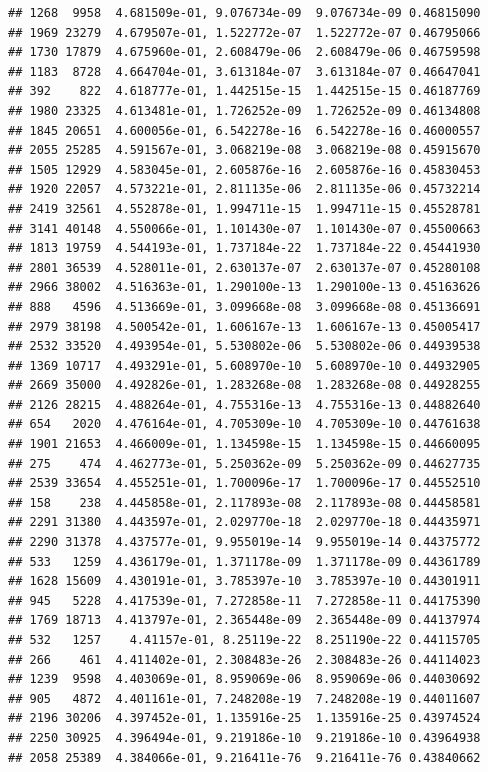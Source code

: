 \documentclass[
]{article}
\begin{document}
\begin{verbatim}
## 1268  9958  4.681509e-01, 9.076734e-09  9.076734e-09 0.46815090
## 1969 23279  4.679507e-01, 1.522772e-07  1.522772e-07 0.46795066
## 1730 17879  4.675960e-01, 2.608479e-06  2.608479e-06 0.46759598
## 1183  8728  4.664704e-01, 3.613184e-07  3.613184e-07 0.46647041
## 392    822  4.618777e-01, 1.442515e-15  1.442515e-15 0.46187769
## 1980 23325  4.613481e-01, 1.726252e-09  1.726252e-09 0.46134808
## 1845 20651  4.600056e-01, 6.542278e-16  6.542278e-16 0.46000557
## 2055 25285  4.591567e-01, 3.068219e-08  3.068219e-08 0.45915670
## 1505 12929  4.583045e-01, 2.605876e-16  2.605876e-16 0.45830453
## 1920 22057  4.573221e-01, 2.811135e-06  2.811135e-06 0.45732214
## 2419 32561  4.552878e-01, 1.994711e-15  1.994711e-15 0.45528781
## 3141 40148  4.550066e-01, 1.101430e-07  1.101430e-07 0.45500663
## 1813 19759  4.544193e-01, 1.737184e-22  1.737184e-22 0.45441930
## 2801 36539  4.528011e-01, 2.630137e-07  2.630137e-07 0.45280108
## 2966 38002  4.516363e-01, 1.290100e-13  1.290100e-13 0.45163626
## 888   4596  4.513669e-01, 3.099668e-08  3.099668e-08 0.45136691
## 2979 38198  4.500542e-01, 1.606167e-13  1.606167e-13 0.45005417
## 2532 33520  4.493954e-01, 5.530802e-06  5.530802e-06 0.44939538
## 1369 10717  4.493291e-01, 5.608970e-10  5.608970e-10 0.44932905
## 2669 35000  4.492826e-01, 1.283268e-08  1.283268e-08 0.44928255
## 2126 28215  4.488264e-01, 4.755316e-13  4.755316e-13 0.44882640
## 654   2020  4.476164e-01, 4.705309e-10  4.705309e-10 0.44761638
## 1901 21653  4.466009e-01, 1.134598e-15  1.134598e-15 0.44660095
## 275    474  4.462773e-01, 5.250362e-09  5.250362e-09 0.44627735
## 2539 33654  4.455251e-01, 1.700096e-17  1.700096e-17 0.44552510
## 158    238  4.445858e-01, 2.117893e-08  2.117893e-08 0.44458581
## 2291 31380  4.443597e-01, 2.029770e-18  2.029770e-18 0.44435971
## 2290 31378  4.437577e-01, 9.955019e-14  9.955019e-14 0.44375772
## 533   1259  4.436179e-01, 1.371178e-09  1.371178e-09 0.44361789
## 1628 15609  4.430191e-01, 3.785397e-10  3.785397e-10 0.44301911
## 945   5228  4.417539e-01, 7.272858e-11  7.272858e-11 0.44175390
## 1769 18713  4.413797e-01, 2.365448e-09  2.365448e-09 0.44137974
## 532   1257    4.41157e-01, 8.25119e-22  8.251190e-22 0.44115705
## 266    461  4.411402e-01, 2.308483e-26  2.308483e-26 0.44114023
## 1239  9598  4.403069e-01, 8.959069e-06  8.959069e-06 0.44030692
## 905   4872  4.401161e-01, 7.248208e-19  7.248208e-19 0.44011607
## 2196 30206  4.397452e-01, 1.135916e-25  1.135916e-25 0.43974524
## 2250 30925  4.396494e-01, 9.219186e-10  9.219186e-10 0.43964938
## 2058 25389  4.384066e-01, 9.216411e-76  9.216411e-76 0.43840662

\end{verbatim}
\end{document}
